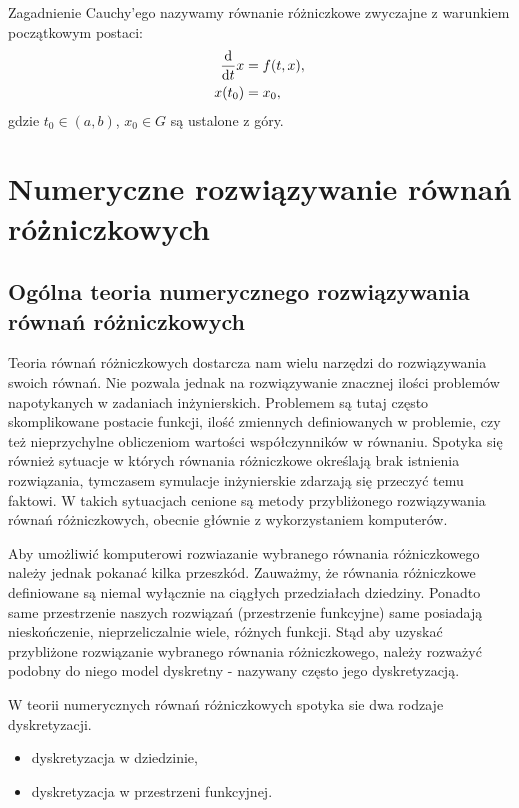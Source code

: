 \documentclass[12pt,a4paper]{report}
\begin{document}
\begin{problem} \label{prob-zagadnienie-cauchy}
Zagadnienie Cauchy'ego nazywamy równanie różniczkowe zwyczajne z warunkiem początkowym postaci:
\begin{align*}
 \frac{\mathrm{d} {} }{\mathrm{d}{t}} x &= f(t,x), \\
 x(t_0) &= x_0,
\end{align*}
gdzie $t_0 \in (a,b)$, $x_0 \in G$ są ustalone z góry. 
\end{problem}



\chapter{Numeryczne rozwiązywanie równań różniczkowych}

\section{Ogólna teoria numerycznego rozwiązywania równań różniczkowych}

Teoria równań różniczkowych dostarcza nam wielu narzędzi do rozwiązywania swoich równań. Nie pozwala jednak na rozwiązywanie znacznej ilości problemów napotykanych w zadaniach inżynierskich. Problemem są tutaj często skomplikowane postacie funkcji, ilość zmiennych definiowanych w problemie, czy też nieprzychylne obliczeniom wartości współczynników w równaniu. Spotyka się również sytuacje w których równania różniczkowe określają brak istnienia rozwiązania, tymczasem symulacje inżynierskie zdarzają się przeczyć temu faktowi. W takich sytuacjach cenione są metody przybliżonego rozwiązywania równań różniczkowych, obecnie głównie z wykorzystaniem komputerów. 

Aby umożliwić komputerowi rozwiazanie wybranego równania różniczkowego należy jednak pokanać kilka przeszkód. Zauważmy, że równania różniczkowe definiowane są niemal wyłącznie na ciągłych przedziałach dziedziny. Ponadto same przestrzenie naszych rozwiązań (przestrzenie funkcyjne) same posiadają nieskończenie, nieprzeliczalnie wiele, różnych funkcji. Stąd aby uzyskać przybliżone rozwiązanie wybranego równania różniczkowego, należy rozważyć podobny do niego model dyskretny - nazywany często jego dyskretyzacją. 

W teorii numerycznych równań różniczkowych spotyka sie dwa rodzaje dyskretyzacji.
\begin{itemize}
\item dyskretyzacja w dziedzinie,
\item dyskretyzacja w przestrzeni funkcyjnej.
\end{itemize}
\end{document}

